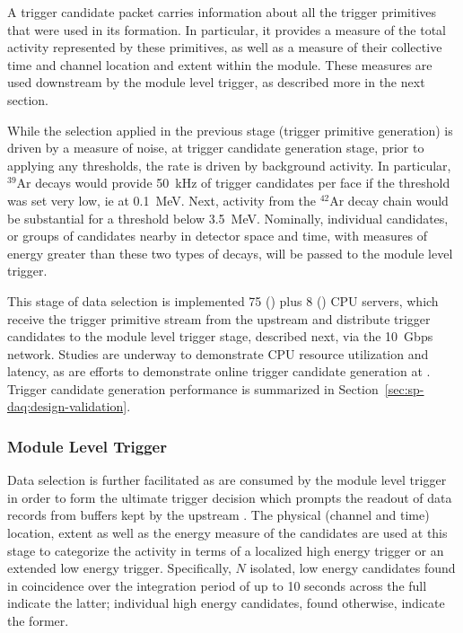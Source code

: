 A trigger candidate packet carries information about all the trigger
primitives that were used in its formation. 
In particular, it provides a measure of the total activity represented
by these primitives, as well as a measure of their collective time and channel
location and extent within the module.
These measures are used downstream by the module level trigger, 
as described more in the next section.

While the selection applied in the previous stage (trigger primitive
generation) is driven by a measure of noise, at trigger candidate
generation stage, prior to applying any thresholds, the rate is driven by
background activity.  
In particular, $^{39}$Ar decays would provide \SI{50}{\kilo\hertz} of
trigger candidates per  face if the threshold was set very low, ie at
\SI{0.1}{\MeV}.
Next, activity from the $^{42}$Ar decay chain would be substantial for a
threshold below \SI{3.5}{\MeV}.
Nominally, individual candidates, or groups of candidates nearby in
detector space and time, with measures of energy greater than these two
types of decays, will be passed to the module level trigger. 

This stage of data selection is implemented 75 () plus 8
() CPU servers, which receive the trigger primitive stream from the upstream  and distribute trigger candidates to the module level trigger
stage, described next, via the \SI{10}{Gbps}  network. Studies are underway to demonstrate CPU
resource utilization and latency, as are efforts to demonstrate online trigger candidate generation
at . Trigger candidate generation performance is summarized in
Section~\ref{sec:sp-daq:design-validation}. 



\subsubsection{Module Level Trigger}
\label{sec:daq:mlt}

Data selection is further facilitated as  are consumed
by the module level trigger in order to form the ultimate trigger
decision which prompts the readout of data records from buffers kept by the upstream . 
The physical (channel and time) location, extent as well as the energy measure of the
candidates are used at this stage to categorize the activity in terms
of a localized high energy trigger or an extended low energy trigger. 
Specifically, $N$ isolated, low energy candidates found in coincidence
over the integration period of up to 10 seconds across the full 
indicate the latter; individual high energy candidates, found
otherwise, indicate the former.

